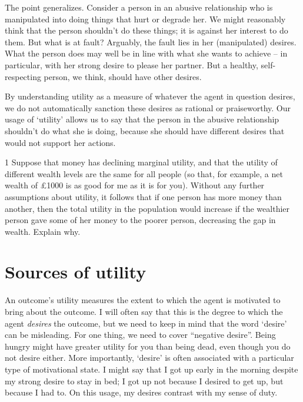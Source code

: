 The point generalizes. Consider a person in an abusive relationship who is
manipulated into doing things that hurt or degrade her. We might reasonably
think that the person shouldn't do these things; it is against her interest to
do them. But what is at fault? Arguably, the fault lies in her (manipulated)
desires. What the person does may well be in line with what she wants to achieve
-- in particular, with her strong desire to please her partner. But a healthy,
self-respecting person, we think, should have other desires.

By understanding utility as a measure of whatever the agent in question desires,
we do not automatically sanction these desires as rational or praiseworthy. Our
usage of `utility' allows us to say that the person in the abusive relationship
shouldn't do what she is doing, because she should have different desires that
would not support her actions.


\begin{exercise}{1}
  Suppose that money has declining marginal utility, and that the utility of
  different wealth levels are the same for all people (so that, for example, a
  net wealth of £1000 is as good for me as it is for you). Without any further
  assumptions about utility, it follows that if one person has more money than
  another, then the total utility in the population would increase if the
  wealthier person gave some of her money to the poorer person, decreasing the
  gap in wealth. Explain why.
\end{exercise}

\section{Sources of utility}\label{sec:sources-utility}

An outcome's utility measures the extent to which the agent is motivated to
bring about the outcome. I will often say that this is the degree to which the
agent \emph{desires} the outcome, but we need to keep in mind that the word
`desire' can be misleading. For one thing, we need to cover ``negative desire''.
Being hungry might have greater utility for you than being dead, even though you
do not desire either. More importantly, `desire' is often associated with a
particular type of motivational state. I might say that I got up early in the
morning despite my strong desire to stay in bed; I got up not because I desired
to get up, but because I had to. On this usage, my desires contrast with my
sense of duty.

